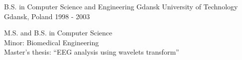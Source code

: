 
\begin{cventries}

  \cventry
    {B.S. in Computer Science and Engineering} %
    {Gdansk University of Technology} %
    {Gdansk, Poland} %
    {1998 - 2003} %
    {
      \begin{cvitems} %
        \item 
        {
          M.S. and B.S. in Computer Science \\
          Minor: Biomedical Engineering \\
          Master’s thesis: “EEG analysis using wavelets transform”
        }
      \end{cvitems}
    }

\end{cventries}
